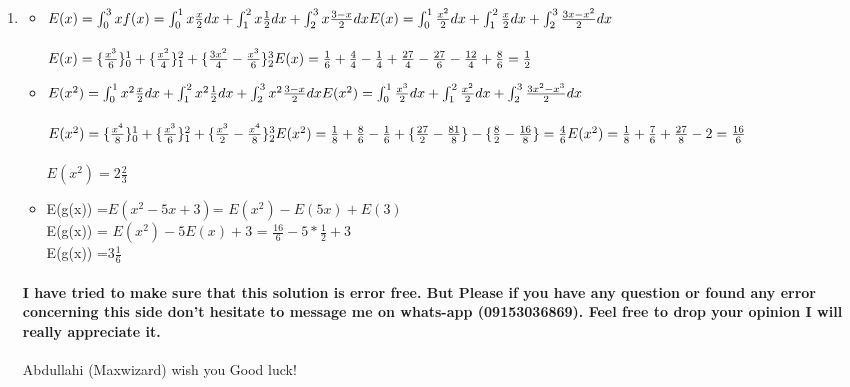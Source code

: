 \documentclass[a4paper,11pt]{article}
\begin{document}
\begin{enumerate}
\begin{itemize}
    \end{itemize}
    \item 
    \begin{itemize}
        \item $E(x)=\int_0^3xf(x)=\int_0^1 x\frac{x}{2}dx + \int_1^2 x\frac{1}{2}dx +\int_2^3 x\frac{3-x}{2}dx \\\\
    E(x)=\int_0^1 \frac{x^2}{2}dx + \int_1^2 \frac{x}{2}dx +\int_2^3 \frac{3x-x^2}{2}dx$\\\\
    $E(x)=\{\frac{x^3}{6}\}_0^1 + \{\frac{x^2}{4}\}_1^2 + \{\frac{3x^2}{4}-\frac{x^3}{6}\}_2^3\\\\
    E(x)=\frac{1}{6} +\frac{4}{4} -\frac{1}{4} + \frac{27}{4}-\frac{27}{6}- \frac{12}{4}+\frac{8}{6}
=\frac{1}{2} $
\vspace{0.7cm}
\item $E(x^2)=\int_0^1 x^2\frac{x}{2}dx + \int_1^2 x^2\frac{1}{2}dx +\int_2^3 x^2\frac{3-x}{2}dx \\\\
E(x^2)=\int_0^1 \frac{x^3}{2}dx + \int_1^2 \frac{x^2}{2}dx +\int_2^3 \frac{3x^2-x^3}{2}dx$\\\\
$E(x^2)=\{\frac{x^4}{8}\}_0^1 + \{\frac{x^3}{6}\}_1^2 + \{\frac{x^3}{2}-\frac{x^4}{8}\}_2^3\\\\
E(x^2)=\frac{1}{8} + \frac{8}{6}-\frac{1}{6} + \{\frac{27}{2}-\frac{81}{8}\}-\{\frac{8}{2}-\frac{16}{8}\}
=\frac{4}{6} \\\\
E(x^2)=\frac{1}{8} + \frac{7}{6}+ \frac{27}{8}-2= \frac{16}{6}$\\\\
$E(x^2)=2\frac{2}{3}$
\vspace{0.9cm}
\item E(g(x)) =$E(x^2-5x+3)$= $E(x^2)-E(5x)+E(3)$\\
E(g(x)) = $E(x^2)-5E(x)+3$ = $\frac{16}{6}-5*\frac{1}{2}+3$\\
E(g(x)) =$3\frac{1}{6}$
\end{itemize}
\paragraph{ I have tried to make sure that this solution is error free. But Please if you have any question or found any error concerning this side don't hesitate to message me on whats-app (09153036869). Feel free to drop your opinion I will really appreciate it.}

\begin{center}
   \Large{Abdullahi (Maxwizard) wish you Good luck!} \\
\end{center}

\end{enumerate}
 
\end{document}
